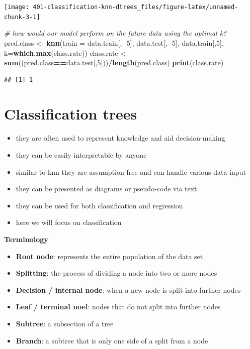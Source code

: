 \documentclass[
]{book}
\newenvironment{Shaded}{\begin{snugshade}}{\end{snugshade}}
\newcommand{\CommentTok}[1]{\textcolor[rgb]{0.56,0.35,0.01}{\textit{#1}}}
\newcommand{\DataTypeTok}[1]{\textcolor[rgb]{0.13,0.29,0.53}{#1}}
\newcommand{\DecValTok}[1]{\textcolor[rgb]{0.00,0.00,0.81}{#1}}
\newcommand{\KeywordTok}[1]{\textcolor[rgb]{0.13,0.29,0.53}{\textbf{#1}}}
\newcommand{\NormalTok}[1]{#1}
\newcommand{\OperatorTok}[1]{\textcolor[rgb]{0.81,0.36,0.00}{\textbf{#1}}}
\newcommand{\StringTok}[1]{\textcolor[rgb]{0.31,0.60,0.02}{#1}}
\providecommand{\tightlist}{%
  \setlength{\itemsep}{0pt}\setlength{\parskip}{0pt}}
\theoremstyle{definition}
\theoremstyle{definition}
\theoremstyle{definition}
\theoremstyle{remark}
\begin{document}
\begin{center}\texttt{[image: 401-classification-knn-dtrees\_files/figure-latex/unnamed-chunk-3-1]} \end{center}

\begin{Shaded}
\begin{Highlighting}[]
\CommentTok{\# how would our model perform on the future data using the optimal k?}
\NormalTok{pred.class \textless{}{-}}\StringTok{ }\KeywordTok{knn}\NormalTok{(}\DataTypeTok{train =}\NormalTok{ data.train[, }\DecValTok{{-}5}\NormalTok{], data.test[, }\DecValTok{{-}5}\NormalTok{], data.train[,}\DecValTok{5}\NormalTok{], }\DataTypeTok{k=}\KeywordTok{which.max}\NormalTok{(class.rate))}
\NormalTok{class.rate \textless{}{-}}\StringTok{ }\KeywordTok{sum}\NormalTok{((pred.class}\OperatorTok{==}\NormalTok{data.test[,}\DecValTok{5}\NormalTok{]))}\OperatorTok{/}\KeywordTok{length}\NormalTok{(pred.class)}
\KeywordTok{print}\NormalTok{(class.rate)}
\end{Highlighting}
\end{Shaded}

\begin{verbatim}
## [1] 1
\end{verbatim}

\hypertarget{classification-trees}{%
\section{Classification trees}\label{classification-trees}}

\begin{itemize}
\tightlist
\item
  they are often used to represent knowledge and aid decision-making
\item
  they can be easily interpretable by anyone
\item
  similar to knn they are assumption free and can handle various data input
\item
  they can be presented as diagrams or pseudo-code via text
\item
  they can be used for both classification and regression
\item
  here we will focus on classification
\end{itemize}

\textbf{Terminology}

\begin{itemize}
\tightlist
\item
  \textbf{Root node}: represents the entire population of the data set
\item
  \textbf{Splitting}: the process of dividing a node into two or more nodes
\item
  \textbf{Decision / internal node}: when a new node is split into further nodes
\item
  \textbf{Leaf / terminal noel}: nodes that do not split into further nodes
\item
  \textbf{Subtree}: a subsection of a tree
\item
  \textbf{Branch}: a subtree that is only one side of a split from a node
\end{itemize}
\end{document}

